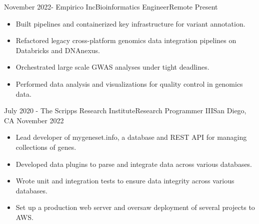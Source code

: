 %
%
%

\begin{experiences}
  \experience
    {November 2022- } {Empirico Inc}{Bioinformatics Engineer}{Remote}
    {Present} {
    \begin{itemize}
    \item Built pipelines and containerized key infrastructure for variant annotation.
    \item Refactored legacy cross-platform genomics data integration pipelines on Databricks and DNAnexus.
    \item Orchestrated large scale GWAS analyses under tight deadlines.
    \item Performed data analysis and visualizations for quality control in genomics data.
    \end{itemize}
    }

  \emptySeparator

  \experience
    {July 2020 -} {The Scripps Research Institute}{Research Programmer III}{San Diego, CA}
    {November 2022} {
    \begin{itemize}
    \item Lead developer of mygeneset.info, a database and REST API for managing collections of genes.
    \item Developed data plugins to parse and integrate data across various databases.
    \item Wrote unit and integration tests to ensure data integrity across various databases.
    \item Set up a production web server and oversaw deployment of several projects to AWS.
    \end{itemize}
    }

  \emptySeparator


\end{experiences}
